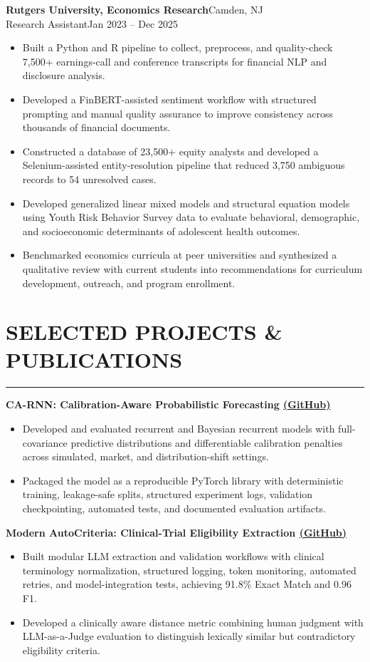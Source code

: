 \documentclass[10pt]{article}
\newcommand{\resheading}[1]{%
  \section*{#1}\vspace{-4pt}\color{rulegray}\hrule\vspace{4pt}\color{black}
}
\newcommand{\workentry}[4]{%
  \textbf{#1}\hfill #2\\[-1pt]%
  #3\hfill #4\\[-5pt]%
}
\newcommand{\projentry}[1]{%
  \textbf{#1}\\[-7pt]
}
\newenvironment{tightitemize}{%
  \begin{itemize}[topsep=0pt,itemsep=1pt,parsep=0pt,partopsep=0pt]
}{%
  \end{itemize}
}
\begin{document}
\workentry{Rutgers University, Economics Research}{Camden, NJ}{Research Assistant}{Jan 2023 -- Dec 2025}
\begin{itemize}
\item Built a Python and R pipeline to collect, preprocess, and quality-check 7,500+ earnings-call and conference transcripts for financial NLP and disclosure analysis.
\item Developed a FinBERT-assisted sentiment workflow with structured prompting and manual quality assurance to improve consistency across thousands of financial documents.
\item Constructed a database of 23,500+ equity analysts and developed a Selenium-assisted entity-resolution pipeline that reduced 3,750 ambiguous records to 54 unresolved cases.
\item Developed generalized linear mixed models and structural equation models using Youth Risk Behavior Survey data to evaluate behavioral, demographic, and socioeconomic determinants of adolescent health outcomes.
\item Benchmarked economics curricula at peer universities and synthesized a qualitative review with current students into recommendations for curriculum development, outreach, and program enrollment.
\end{itemize}

\resheading{SELECTED PROJECTS \& PUBLICATIONS}

\projentry{CA-RNN: Calibration-Aware Probabilistic Forecasting \href{https://github.com/JonathanMa03/innovative-droBVAR}{(GitHub)}}
\begin{tightitemize}
\item Developed and evaluated recurrent and Bayesian recurrent models with full-covariance predictive distributions and differentiable calibration penalties across simulated, market, and distribution-shift settings.
\item Packaged the model as a reproducible PyTorch library with deterministic training, leakage-safe splits, structured experiment logs, validation checkpointing, automated tests, and documented evaluation artifacts.
\end{tightitemize}

\vspace{2pt}

\projentry{Modern AutoCriteria: Clinical-Trial Eligibility Extraction \href{https://github.com/JonathanMa03/modern-autocrit}{(GitHub)}}
\begin{tightitemize}
\item Built modular LLM extraction and validation workflows with clinical terminology normalization, structured logging, token monitoring, automated retries, and model-integration tests, achieving 91.8\% Exact Match and 0.96 F1.
\item Developed a clinically aware distance metric combining human judgment with LLM-as-a-Judge evaluation to distinguish lexically similar but contradictory eligibility criteria.
\end{tightitemize}
\end{document}
